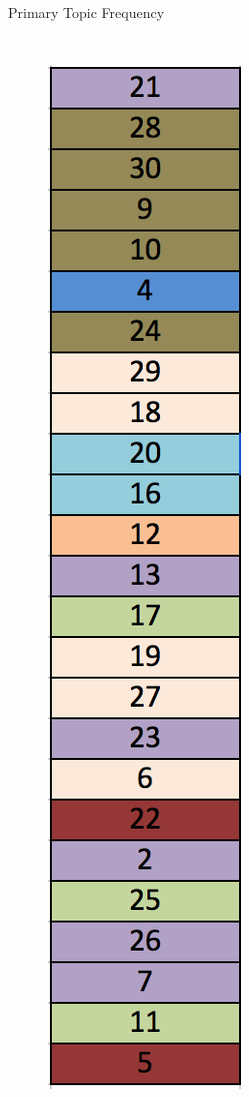 \documentclass[handout,13pt]{beamer}
\begin{document}
\begin{frame}{Primary Topic Frequency}
\begin{columns}
  \begin{figure}[h]
  \centering
  \includegraphics[height=0.75\textheight]{../images/topic_freq.png}
  \label{fig:topics_freq}
  \end{figure}

\end{columns}
\end{frame}
\end{document}
